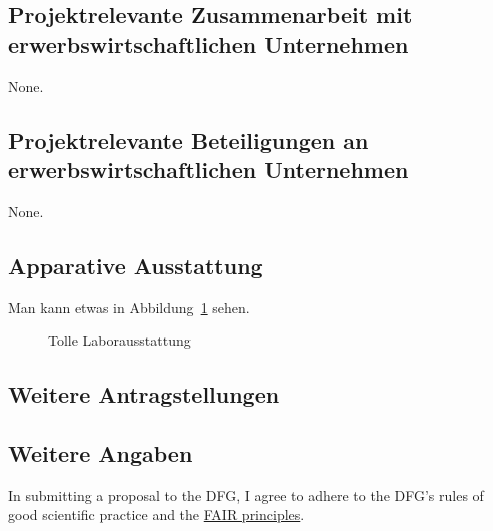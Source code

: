 \documentclass{scrartcl}
\begin{document}
\subsection{Projektrelevante Zusammenarbeit mit erwerbswirtschaftlichen Unternehmen}
None.

\subsection{Projektrelevante Beteiligungen an erwerbswirtschaftlichen Unternehmen}
None.

\subsection{Apparative Ausstattung}
Man kann etwas in Abbildung~\ref{fig:some_nice_graph} sehen.
\begin{figure}
\centering
{}
\caption{Tolle Laborausstattung}
\label{fig:some_nice_graph}
\end{figure}

\subsection{Weitere Antragstellungen}

\subsection{Weitere Angaben}
In submitting a proposal to the DFG, I agree to adhere to the DFG's rules of good scientific practice and the \href{https://www.nature.com/articles/sdata201618}{FAIR principles}.

\end{document}
